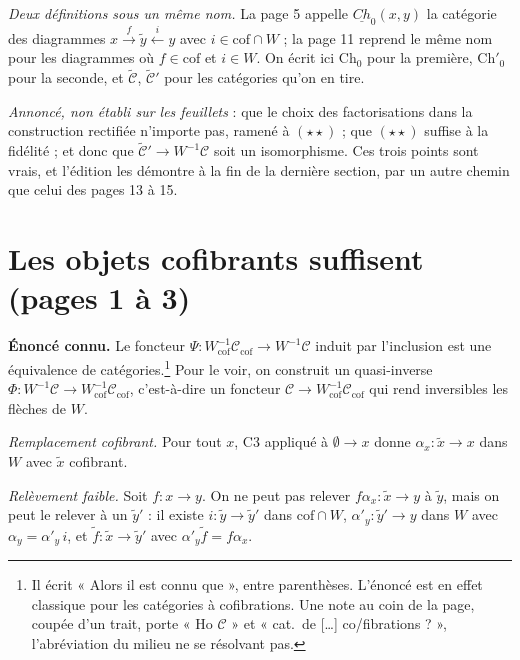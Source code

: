 \documentclass[11pt,a4paper]{article}
\begin{document}
\emph{Deux définitions sous un même nom.} La page 5 appelle
$\underline{Ch}_{0}(x,y)$ la catégorie des diagrammes
$x \xrightarrow{f} \widetilde{y} \xleftarrow{i} y$ avec $i \in \mathrm{cof}
\cap W$ ; la page 11 reprend le même nom pour les diagrammes où
$f \in \mathrm{cof}$ et $i \in W$. On écrit ici $\mathrm{Ch}_{0}$ pour la
première, $\mathrm{Ch}'_{0}$ pour la seconde, et $\widetilde{\mathcal{C}}$,
$\widetilde{\mathcal{C}}'$ pour les catégories qu'on en tire.

\emph{Annoncé, non établi sur les feuillets} : que le choix des
factorisations dans la construction rectifiée n'importe pas, ramené à
$(\star\star)$ ; que $(\star\star)$ suffise à la fidélité ; et donc que
$\widetilde{\mathcal{C}}' \to W^{-1}\mathcal{C}$ soit un isomorphisme. Ces
trois points sont vrais, et l'édition les démontre à la fin de la dernière
section, par un autre chemin que celui des pages 13 à 15.

\section*{Les objets cofibrants suffisent (pages 1 à 3)}

\textbf{Énoncé connu.} Le foncteur $\Psi :
W_{\mathrm{cof}}^{-1}\mathcal{C}_{\mathrm{cof}} \to W^{-1}\mathcal{C}$ induit
par l'inclusion est une équivalence de catégories.\footnote{Il écrit « Alors il
est connu que », entre parenthèses. L'énoncé est en effet classique pour les
catégories à cofibrations. Une note au coin de la page, coupée d'un trait,
porte « Ho $\mathcal{C}$ » et « cat.\ de […] co/fibrations ? », l'abréviation
du milieu ne se résolvant pas.} Pour le voir, on construit un quasi-inverse
$\Phi : W^{-1}\mathcal{C} \to W_{\mathrm{cof}}^{-1}\mathcal{C}_{\mathrm{cof}}$,
c'est-à-dire un foncteur $\mathcal{C} \to
W_{\mathrm{cof}}^{-1}\mathcal{C}_{\mathrm{cof}}$ qui rend inversibles les
flèches de $W$.

\emph{Remplacement cofibrant.} Pour tout $x$, C3 appliqué à $\emptyset \to x$
donne $\alpha_{x} : \widetilde{x} \to x$ dans $W$ avec $\widetilde{x}$
cofibrant.

\emph{Relèvement faible.} Soit $f : x \to y$. On ne peut pas relever
$f\alpha_{x} : \widetilde{x} \to y$ à $\widetilde{y}$, mais on peut le relever à
un $\widetilde{y}'$ : il existe $i : \widetilde{y} \to \widetilde{y}'$ dans
$\mathrm{cof} \cap W$, $\alpha'_{y} : \widetilde{y}' \to y$ dans $W$ avec
$\alpha_{y} = \alpha'_{y}\, i$, et $\widetilde{f} : \widetilde{x} \to
\widetilde{y}'$ avec $\alpha'_{y}\widetilde{f} = f\alpha_{x}$.
\end{document}
